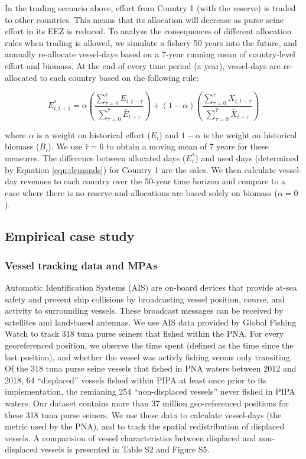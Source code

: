 \documentclass[12pt]{article}
\begin{document}
In the trading scenario above, effort from Country 1 (with the reserve) is traded to other countries. This means that its allocation will decrease as purse seine effort in its EEZ is reduced. To analyze the consequences of different allocation rules when trading is allowed, we simulate a fishery 50 years into the future, and annually re-allocate vessel-days based on a 7-year running mean of country-level effort and biomass. At the end of every time period (a year), vessel-days are re-allocated to each country based on the following rule:

$$
E_{i,t+1}^* = \alpha
\left(\frac{\sum_{\tau = 0}^{\hat{\tau}}E_{i,t-\tau}}{\sum_{\tau = 0}^{\hat{\tau}}\bar{E}_{{t-\tau}}}
	\right)
	+
(1 - \alpha)
\left(\frac{\sum_{\tau = 0}^{\hat{\tau}}X_{i,t-\tau}}{\sum_{\tau = 0}^{\hat{\tau}}\bar{X}_{t-\tau}} \right)
$$

\noindent where $\alpha$ is a weight on historical effort ($E_i$) and $1-\alpha$ is the weight on historical biomass ($B_i$). We use $\hat{\tau}= 6$ to obtain a moving mean of 7 years for these measures. The difference between allocated days ($E_i^*$) and used days (determined by Equation \ref{eqn:demands}) for Country 1 are the sales. We then calculate vessel-day revenues to each country over the 50-year time horizon and compare to a case where there is no reserve and allocations are based solely on biomass ($\alpha = 0$).

\subsection{Empirical case study}

\subsubsection{Vessel tracking data and MPAs}

Automatic Identification Systems (AIS) are on-board devices that provide at-sea safety and prevent ship collisions by broadcasting vessel position, course, and activity to surrounding vessels. These broadcast messages can be received by satellites and land-based antennas. We use AIS data provided by Global Fishing Watch \cite{kroodsma_2018} to track 318 tuna purse seiners that fished within the PNA. For every georeferenced position, we observe the time spent (defined as the time since the last position), and whether the vessel was activly fishing versus only transiting. Of the 318 tuna purse seine vessels that fished in PNA waters between 2012 and 2018, 64 ``displaced'' vessels fished within PIPA at least once prior to its implementation, the remianing 254 ``non-displaced vessels'' never fished in PIPA waters. Our dataset contains more than 37 million geo-referenced positions for these 318 tuna purse seiners. We use these data to calculate vessel-days (the metric used by the PNA), and to track the spatial redistribution of displaced vessels. A comparision of vessel characteristics between displaced and non-displaced vessels is presented in Table S2 and Figure S5.
\end{document}
